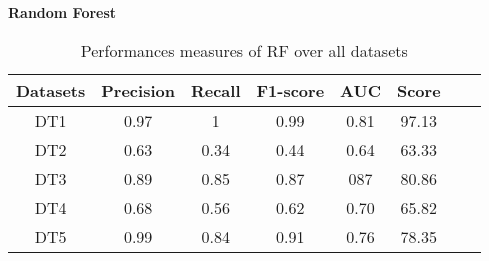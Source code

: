 \documentclass[10pt,a4paper]{article}
\begin{document}
\begin{center}
\textbf{Random Forest}
\end{center}
\begin{table}[!ht]
\centering
\begin{tabular}{*{6}{c}l r}
  \toprule
  \textbf{Datasets} & \textbf{Precision} & \textbf{Recall} & \textbf{F1-score}&\textbf{AUC} &\textbf{Score}\\
   \midrule
  DT1 &0.97 &1   &0.99 &0.81 &97.13 \\
  DT2 &0.63  & 0.34  &0.44&0.64&63.33 \\
  DT3 &0.89 &0.85 &0.87&087&80.86\\
  DT4 &0.68 &0.56&0.62&0.70&65.82\\
  DT5 &0.99 &0.84&0.91&0.76&78.35\\
  
  
    \bottomrule
\end{tabular}
\caption{Performances measures of RF over all datasets}\label{perf-measure-dt1}
\end{table}
\end{document}
